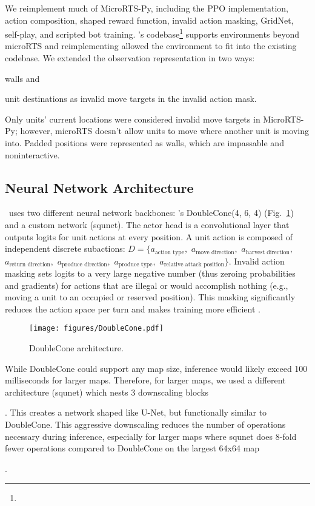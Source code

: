 \documentclass[conference]{IEEEtran}
\newif\ifsupplemental
\newcommand{\supptableref}[1]{%
  \ifsupplemental
    \ (Supplemental Table~\ref{#1})%
  \fi
}
\newcommand{\suppfigref}[1]{%
  \ifsupplemental
    \ (Supplemental Figure~\ref{#1})%
  \fi
}
\begin{document}
We reimplement much of MicroRTS-Py, including the PPO implementation, action
composition, shaped reward function, invalid action masking, GridNet, self-play, and
scripted bot training. \agentName's codebase\footnote{\rlAlgoImplsGitHubUrl} supports 
environments beyond microRTS and reimplementing allowed the environment to fit into the 
existing codebase. We extended the observation representation in two ways:
\begin{inparaenum}[(1)]
    \item walls and
    \item unit destinations as invalid move targets in the invalid action mask.
\end{inparaenum}
Only units' current locations were considered invalid move targets in MicroRTS-Py;
however, microRTS doesn't allow units to move where another unit is moving into. Padded
positions were represented as walls, which are impassable and noninteractive.

\subsection{Neural Network Architecture}
\agentName\ uses two different neural network backbones:
\cite{Ferdinand2021doublecone}'s DoubleCone(4, 6, 4) (Fig.~\ref{fig:doublecone}) and a
custom network (squnet). The actor head is a convolutional layer that outputs logits for
unit actions at every position. A unit action is composed of independent discrete
subactions: $D = \{a_{\text{action type}},$ $a_{\text{move direction}},$
$a_{\text{harvest direction}},$ $a_{\text{return direction}},$ $a_{\text{produce
direction}},$ $a_{\text{produce type}},$ $a_{\text{relative attack position}}\}$.
Invalid action masking sets logits to a very large negative number (thus zeroing
probabilities and gradients) for actions that are illegal or would accomplish nothing
(e.g., moving a unit to an occupied or reserved position). This masking significantly
reduces the action space per turn and makes training more efficient
\cite{DBLP:journals/corr/abs-2006-14171}.

\begin{figure}[t]
    \centering
    \texttt{[image: figures/DoubleCone.pdf]}
    \caption{DoubleCone architecture.}
    \label{fig:doublecone}
\end{figure}

While DoubleCone could support any map size, inference would likely exceed 100
milliseconds for larger maps. Therefore, for larger maps, we used a different
architecture (squnet) which nests 3 downscaling blocks\suppfigref{fig:squnet}. This 
creates a network shaped like U-Net, but functionally similar to DoubleCone.
This aggressive downscaling reduces the number of operations necessary during inference,
especially for larger maps where squnet does 8-fold fewer operations compared to
DoubleCone on the largest 64x64 map\supptableref{table:architectureBreakdown}.
\end{document}
